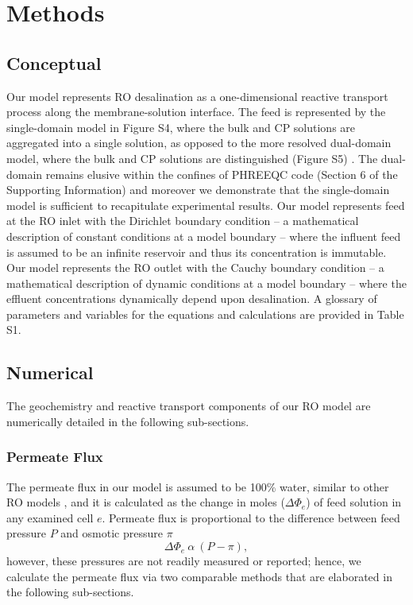 \section{Methods}

\subsection{Conceptual}

Our model represents RO desalination as a one-dimensional reactive transport process along the membrane-solution interface. The feed is represented by the single-domain model in Figure S4, where the bulk and CP solutions are aggregated into a single solution, as opposed to the more resolved dual-domain model, where the bulk and CP solutions are distinguished (Figure S5) \cite{Chen2016AssessingModel,Scruggs2019TheInterface,Greskowiak2015AUVI,Mieles2012AnalyticalSystem}. The dual-domain remains elusive within the confines of PHREEQC code (Section 6 of the Supporting Information) and moreover we demonstrate that the single-domain model is sufficient to recapitulate experimental results. Our model represents feed at the RO inlet with the Dirichlet boundary condition \cite{Moes2006ImposingMethod,Bazilevs2007WeakMechanics} -- a mathematical description of constant conditions at a model boundary -- where the influent feed is assumed to be an infinite reservoir and thus its concentration is immutable. Our model represents the RO outlet with the Cauchy boundary condition \cite{Gosses2018ExplicitModels} -- a mathematical description of dynamic conditions at a model boundary -- where the effluent concentrations dynamically depend upon desalination. A glossary of parameters and variables for the equations and calculations are provided in Table S1.


\subsection{Numerical}
The geochemistry and reactive transport components of our RO model are numerically detailed in the following sub-sections. 

\subsubsection{Permeate Flux}
The permeate flux in our model is assumed to be 100\% water, similar to other RO models \cite{Li2012OptimalDesalination}, and it is calculated as the change in moles ($\Delta \Phi_{e}$) of feed solution in any examined cell $e$. Permeate flux is proportional to the difference between feed pressure $P$ and osmotic pressure $\pi$ \cite{VanWagner2009EffectPerformance,Schock1987MassModules,Lonsdale1965TransportMembranes}
\begin{equation} \label{pressure_differential}
    \Delta \Phi_{e} ~ \alpha ~ (P - \pi),
\end{equation} 
however, these pressures are not readily measured or reported; hence, we calculate the permeate flux via two comparable methods that are elaborated in the following sub-sections.


